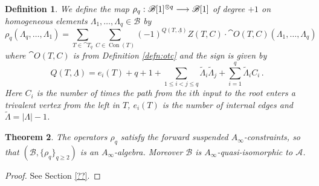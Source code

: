 \documentclass[english,letter paper,12pt,leqno]{article}
\newtheorem{theorem}{Theorem}[section]
\theoremstyle{example}
\newtheorem{definition}[theorem]{Definition}
\numberwithin{equation}{section}
\begin{document}
\begin{definition}\label{defn:bainf} We define the map $\rho_q: \mathscr{B}[1]^{\otimes q} \longrightarrow \mathscr{B}[1]$ of degree $+1$ on homogeneous elements $\Lambda_1,\ldots,\Lambda_q \in \mathscr{B}$ by
\[
\rho_q( \Lambda_q, \ldots, \Lambda_1 ) = \sum_{T \in \cat{T}_q} \sum_{C \in \operatorname{Con}(T)} (-1)^{Q(T, \underline{\Lambda})} Z(T,C) \cdot \cat{O}(T, C)( \Lambda_1, \ldots, \Lambda_q )
\]
where $\cat{O}(T,C)$ is from Definition \ref{defn:otc} and the sign is given by
\[
Q(T, \underline{\Lambda}) = e_i(T) + q + 1 + \sum_{1 \le i < j \le q} \widetilde{\Lambda}_i \widetilde{\Lambda}_j + \sum_{i=1}^q \widetilde{\Lambda}_i C_i\,.
\]
Here $C_i$ is the number of times the path from the $i$th input to the root enters a trivalent vertex from the left in $T$, $e_i(T)$ is the number of internal edges and $\widetilde{\Lambda} = |\Lambda| - 1$.
\end{definition}

\begin{theorem} The operators $\rho_q$ satisfy the forward suspended $A_\infty$-constraints, so that $(\mathscr{B}, \{ \rho_q \}_{q \ge 2})$ is an $A_\infty$-algebra. Moreover $\mathscr{B}$ is $A_\infty$-quasi-isomorphic to $\mathscr{A}$.
\end{theorem}
\begin{proof}
See Section \ref{??}.
\end{proof}
\end{document}
